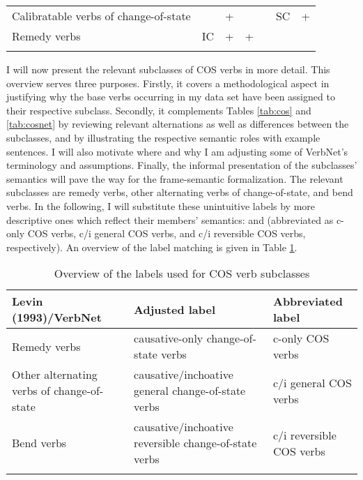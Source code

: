 \begin{table} []
\begin{tabular}{lcccccc}
            Calibratable verbs of change-of-state 
            & \textendash{}
            & + 
            & \textendash{}
            & \textendash{}
            & SC
            & + \\
            
            Remedy verbs
            & IC
            & + 
            & +
            & \textendash{}
            & \textendash{}
            & \textendash{} \\
      \lspbottomrule
    \end{tabular}
\end{table}

I will now present the relevant subclasses of COS verbs in more detail. This overview serves three purposes. Firstly, it covers a methodological aspect in justifying why the base verbs occurring in my data set have been assigned to their respective subclass. 
Secondly, it complements Tables \ref{tab:cos} and \ref{tab:cosnet} by reviewing relevant alternations as well as differences between the subclasses, and by illustrating the respective semantic roles with example sentences. I will also motivate where and why I am adjusting some of VerbNet's terminology and assumptions. 
Finally, the informal presentation of the subclasses' semantics will pave the way for the frame-semantic formalization. The relevant subclasses are remedy verbs, other alternating verbs of change-of-state, and bend verbs. In the following, I will substitute these unintuitive labels by more descriptive ones which reflect their members' semantics:  and  (abbreviated as c-only COS verbs, c/i general COS verbs, and c/i reversible COS verbs, respectively). An overview of the label matching is given in Table \ref{tab:labels}.

\begin{table}
    \caption[Overview of the labels used for COS verb subclasses]{\label{tab:labels}Overview of the labels used for COS verb subclasses}
    \begin{tabular}{
        >{\RaggedRight\arraybackslash}p{}
        >{\RaggedRight\arraybackslash}p{}
        >{\RaggedRight\arraybackslash}p{}
      }
      \lsptoprule
      Levin (1993)/VerbNet & Adjusted label & Abbreviated label \\ 
      \midrule
      Remedy verbs & causative-only change-of-state verbs & c-only COS verbs \\
      Other alternating verbs of change-of-state & causative/inchoative general change-of-state verbs & c/i general COS verbs \\
      Bend verbs & causative/inchoative reversible change-of-state verbs & c/i reversible COS verbs \\
      \lspbottomrule
    \end{tabular} 
\end{table}

